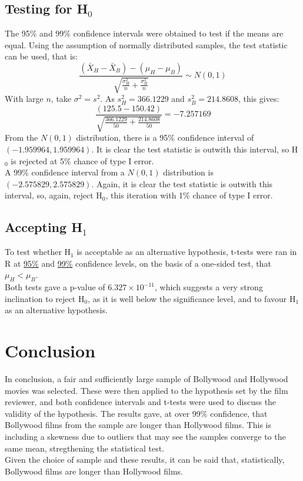 \documentclass{article}
\begin{document}
\subsection{Testing for H$_\text{0}$}
The 95\% and 99\% confidence intervals were obtained to test if the means are equal. Using the assumption of normally distributed samples, the test statistic can be used, that is:
$$\frac{(\bar{X}_H-\bar{X}_B)-(\mu_H-\mu_B)}{\sqrt{\frac{\sigma_H^2}{n}+\frac{\sigma_B^2}{n}}} \sim N(0,1)$$
With large $n$, take $\sigma^2=s^2$. As $s_H^2=366.1229$ and $s_B^2=214.8608$, this gives:
$$\frac{(125.5-150.42)}{\sqrt{\frac{366.1229}{50}+\frac{214.8608}{50}}}=-7.257169$$
From the $N(0,1)$ distribution, there is a 95\% confidence interval of $(-1.959964,1.959964)$. It is clear the test statistic is outwith this interval, so H$_\text{0}$ is rejected at 5\% chance of type I error.\\
A 99\% confidence interval from a $N(0,1)$ distribution is $(-2.575829,2.575829)$. Again, it is clear the test statistic is outwith this interval, so, again, reject H$_\text{0}$, this iteration with 1\% chance of type I error.
\subsection{Accepting H$_\text{1}$}
To test whether H$_\text{1}$ is acceptable as an alternative hypothesis, t-tests were ran in R at \hyperref[sec:95]{95\%} and \hyperref[sec:99]{99\%} confidence levels, on the basis of a one-sided test, that $\mu_H<\mu_B$.\\
Both tests gave a p-value of $6.327\times10^{-11}$, which suggests a very strong inclination to reject H$_\text{0}$, as it is well below the significance level, and to favour H$_\text{1}$ as an alternative hypothesis.
\section{Conclusion}
In conclusion, a fair and sufficiently large sample of Bollywood and Hollywood movies was selected. These were then applied to the hypothesis set by the film reviewer, and both confidence intervals and t-tests were used to discuss the validity of the hypothesis. The results gave, at over 99\% confidence, that Bollywood films from the sample are longer than Hollywood films. This is including a skewness due to outliers that may see the samples converge to the same mean, stregthening the statistical test.\\
Given the choice of sample and these results, it can be said that, statistically, Bollywood films are longer than Hollywood films.
\newpage
\end{document}
